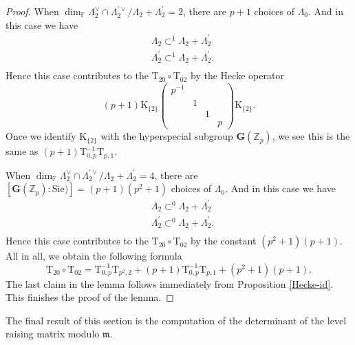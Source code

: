 \documentclass[10pt]{amsart}
\numberwithin{equation}{section}
\theoremstyle{definition}
\def\fracm{\mathfrak{m}}
\def\FF{\mathbb{F}}
\def\bfG{\mathbf{G}}
\def\ZZ{\mathbb{Z}}
\def\rmK{\mathrm{K}}
\def\rmT{\mathrm{T}}
\begin{document}
\begin{proof}
When $\dim_{\FF} \Lambda^{\vee}_{2}\cap\Lambda^{\prime\vee}_{2}/\Lambda_{2}+\Lambda^{\prime}_{2}=2$, there are $p+1$ choices of $\Lambda_{0}$. And in this case we have 
\begin{equation*}
\begin{aligned}
&\Lambda_{2}\subset^{1} \Lambda_{2}+\Lambda^{\prime}_{2}\\ 
&\Lambda^{\prime}_{2}\subset^{1}\Lambda_{2}+\Lambda^{\prime}_{2}.\\ 
\end{aligned}
\end{equation*}
Hence this case contributes to the $\rmT_{20}\circ\rmT_{02}$ by the Hecke operator
\begin{equation*}
(p+1)\rmK_{\{2\}}\begin{pmatrix}p^{-1}&&&\\&1&&\\&&1&\\&&&p \end{pmatrix}\rmK_{\{2\}}.
\end{equation*}
Once we identify $\rmK_{\{2\}}$ with the hyperspecial subgroup $\bfG(\ZZ_{p})$, we see this is the same as $(p+1)\rmT^{-1}_{0,p}\rmT_{p, 1}$.

When $\dim_{\FF} \Lambda^{\vee}_{2}\cap\Lambda^{\prime\vee}_{2}/\Lambda_{2}+\Lambda^{\prime}_{2}=4$, there are $[\bfG(\ZZ_{p}):\mathrm{Sie})]=(p+1)(p^{2}+1)$  choices of $\Lambda_{0}$. And in this case we have
\begin{equation*}
\begin{aligned}
&\Lambda_{2}\subset^{0} \Lambda_{2}+\Lambda^{\prime}_{2}\\ 
&\Lambda^{\prime}_{2}\subset^{0} \Lambda_{2}+\Lambda^{\prime}_{2}.\\ 
\end{aligned}
\end{equation*}
Hence this case contributes to the $\rmT_{20}\circ\rmT_{02}$ by the constant $(p^{2}+1)(p+1)$. All in all, we obtain the following formula
\begin{equation}\label{T20T02}
\rmT_{20}\circ\rmT_{02}= \mathrm{T}^{-1}_{0,p}\rmT_{p^{2}, 2}+(p+1)\mathrm{T}^{-1}_{0,p}\rmT_{p, 1}+(p^{2}+1)(p+1).
\end{equation} 
The last claim in the lemma follows immediately from Proposition \ref{Hecke-id}. This finishes the proof of the lemma.
\end{proof}

The final result of this section is the computation of the determinant of the level raising matrix modulo $\fracm$.
\end{document}
